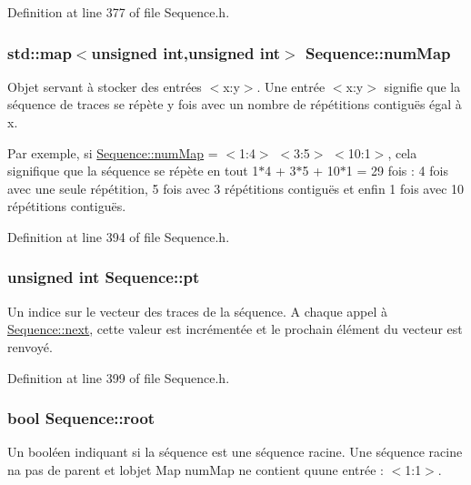 Definition at line 377 of file Sequence.\+h.

\subsubsection[{\texorpdfstring{num\+Map}{numMap}}]{\setlength{\rightskip}{0pt plus 5cm}std\+::map$<$unsigned int,unsigned int$>$ Sequence\+::num\+Map\hspace{0.3cm}{\ttfamily [protected]}}\hypertarget{class_sequence_a3fb6b6543259ea07c976012dd622cdcc}{}\label{class_sequence_a3fb6b6543259ea07c976012dd622cdcc}
Objet servant à stocker des entrées $<$x\+:y$>$. Une entrée $<$x\+:y$>$ signifie que la séquence de traces se répète y fois avec un nombre de répétitions contiguës égal à x.

Par exemple, si \hyperlink{class_sequence_a3fb6b6543259ea07c976012dd622cdcc}{Sequence\+::num\+Map} = $<$1\+:4$>$ $<$3\+:5$>$ $<$10\+:1$>$, cela signifique que la séquence se répète en tout 1$\ast$4 + 3$\ast$5 + 10$\ast$1 = 29 fois \+: 4 fois avec une seule répétition, 5 fois avec 3 répétitions contiguës et enfin 1 fois avec 10 répétitions contiguës. 

Definition at line 394 of file Sequence.\+h.

\subsubsection[{\texorpdfstring{pt}{pt}}]{\setlength{\rightskip}{0pt plus 5cm}unsigned int Sequence\+::pt\hspace{0.3cm}{\ttfamily [protected]}}\hypertarget{class_sequence_a6005aee7fd142d6292dcfeefe062bc82}{}\label{class_sequence_a6005aee7fd142d6292dcfeefe062bc82}
Un indice sur le vecteur des traces de la séquence. A chaque appel à \hyperlink{class_sequence_a5c6f4d1232eb3fddc256a2d654c48c6b}{Sequence\+::next}, cette valeur est incrémentée et le prochain élément du vecteur est renvoyé. 

Definition at line 399 of file Sequence.\+h.

\subsubsection[{\texorpdfstring{root}{root}}]{\setlength{\rightskip}{0pt plus 5cm}bool Sequence\+::root\hspace{0.3cm}{\ttfamily [protected]}}\hypertarget{class_sequence_ac09da762e43cc657842d4f953ffff613}{}\label{class_sequence_ac09da762e43cc657842d4f953ffff613}
Un booléen indiquant si la séquence est une séquence racine. Une séquence racine n\textquotesingle{}a pas de parent et l\textquotesingle{}objet Map {\ttfamily num\+Map} ne contient qu\textquotesingle{}une entrée \+: $<$1\+:1$>$.


